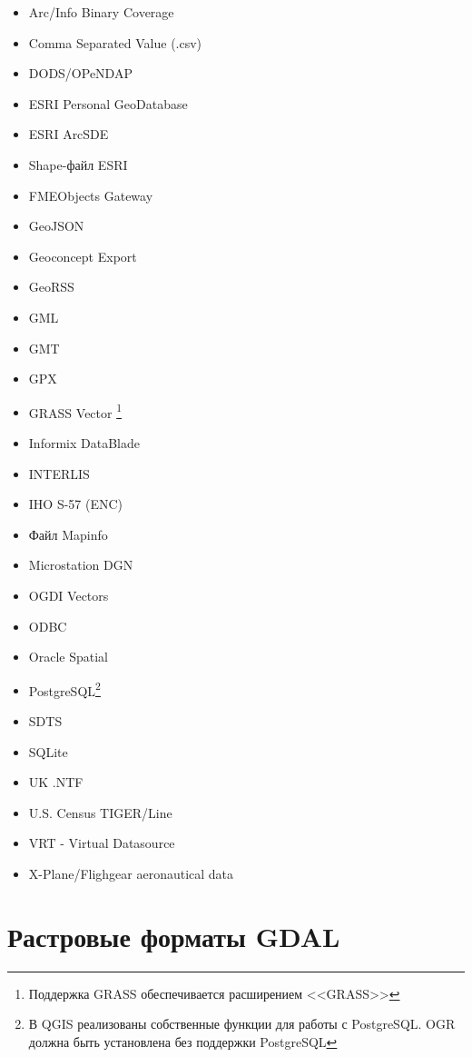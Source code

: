 \begin{itemize}
\item Arc/Info Binary Coverage
\item Comma Separated Value (.csv)
\item DODS/OPeNDAP
\item ESRI Personal GeoDatabase
\item ESRI ArcSDE
\item Shape-файл ESRI
\item FMEObjects Gateway
\item GeoJSON
\item Geoconcept Export
\item GeoRSS
\item GML
\item GMT
\item GPX
\item GRASS Vector \footnote{Поддержка GRASS обеспечивается
    расширением <<GRASS>>}
\item Informix DataBlade
\item INTERLIS
\item IHO S-57 (ENC)
\item Файл Mapinfo %
\item Microstation DGN
\item OGDI Vectors
\item ODBC
\item Oracle Spatial
\item PostgreSQL\footnote{В QGIS реализованы собственные функции для
работы с PostgreSQL. OGR должна быть установлена без поддержки PostgreSQL}
\item SDTS
\item SQLite
\item UK .NTF
\item U.S. Census TIGER/Line
\item VRT - Virtual Datasource
\item X-Plane/Flighgear aeronautical data
\end{itemize}

\section{Растровые форматы GDAL}\label{appdx_gdal}
 

